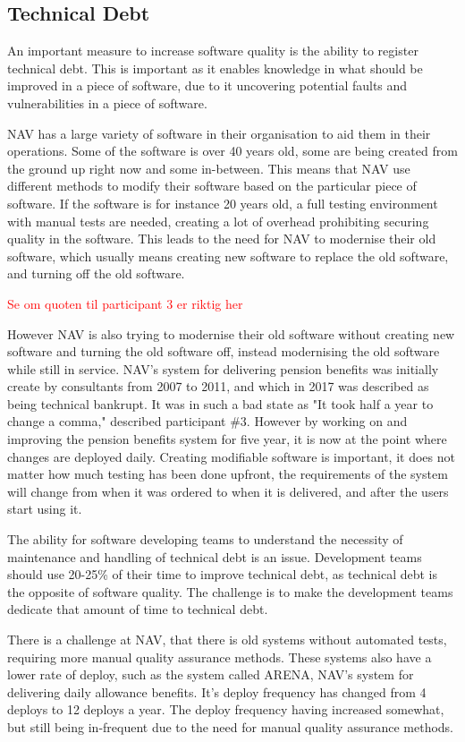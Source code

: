 \subsection{Technical Debt}
An important measure to increase software quality is the ability to register technical debt. This is important as it enables knowledge in what should be improved in a piece of software, due to it uncovering potential faults and vulnerabilities in a piece of software.

NAV has a large variety of software in their organisation to aid them in their operations. Some of the software is over 40 years old, some are being created from the ground up right now and some in-between. This means that NAV use different methods to modify their software based on the particular piece of software. If the software is for instance 20 years old, a full testing environment with manual tests are needed, creating a lot of overhead prohibiting securing quality in the software. This leads to the need for NAV to modernise their old software, which usually means creating new software to replace the old software, and turning off the old software.

\textcolor{red}{Se om quoten til participant 3 er riktig her}

However NAV is also trying to modernise their old software without creating new software and turning the old software off, instead modernising the old software while still in service. NAV's system for delivering pension benefits was initially create by consultants from 2007 to 2011, and which in 2017 was described as being technical bankrupt. It was in such a bad state as "It took half a year to change a comma," described participant \#3. However by working on and improving the pension benefits system for five year, it is now at the point where changes are deployed daily. Creating modifiable software is important, it does not matter how much testing has been done upfront, the requirements of the system will change from when it was ordered to when it is delivered, and after the users start using it.

The ability for software developing teams to understand the necessity of maintenance and handling of technical debt is an issue. Development teams should use 20-25\% of their time to improve technical debt, as technical debt is the opposite of software quality. The challenge is to make the development teams dedicate that amount of time to technical debt.

There is a challenge at NAV, that there is old systems without automated tests, requiring more manual quality assurance methods. These systems also have a lower rate of deploy, such as the system called ARENA, NAV's system for delivering daily allowance benefits. It's deploy frequency has changed from 4 deploys to 12 deploys a year. The deploy frequency having increased somewhat, but still being in-frequent due to the need for manual quality assurance methods.

